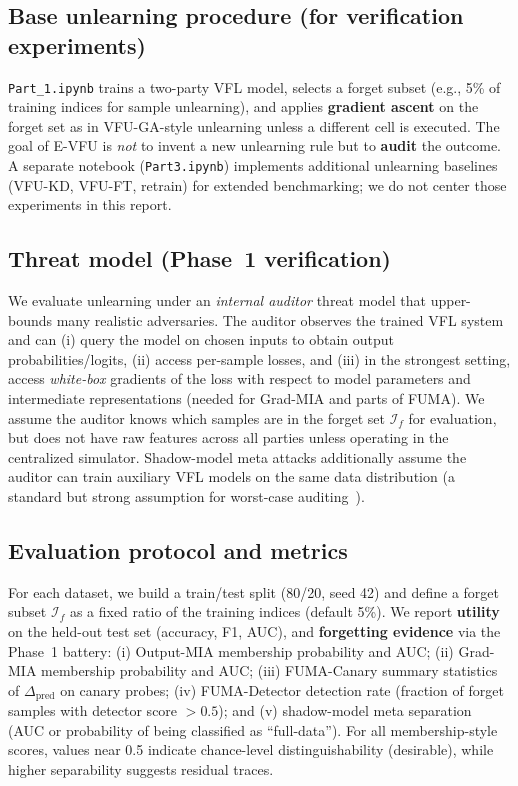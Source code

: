 \documentclass[sigconf,nonacm]{acmart}
\begin{document}
\subsection{Base unlearning procedure (for verification experiments)}
\texttt{Part\_1.ipynb} trains a two-party VFL model, selects a forget subset (e.g., 5\% of training indices for sample unlearning), and applies \textbf{gradient ascent} on the forget set as in VFU-GA-style unlearning unless a different cell is executed. The goal of E-VFU is \emph{not} to invent a new unlearning rule but to \textbf{audit} the outcome. A separate notebook (\texttt{Part3.ipynb}) implements additional unlearning baselines (VFU-KD, VFU-FT, retrain) for extended benchmarking; we do not center those experiments in this report.

\subsection{Threat model (Phase~1 verification)}
We evaluate unlearning under an \emph{internal auditor} threat model that upper-bounds many realistic adversaries. The auditor observes the trained VFL system and can (i) query the model on chosen inputs to obtain output probabilities/logits, (ii) access per-sample losses, and (iii) in the strongest setting, access \emph{white-box} gradients of the loss with respect to model parameters and intermediate representations (needed for Grad-MIA and parts of FUMA). We assume the auditor knows which samples are in the forget set $\mathcal{I}_f$ for evaluation, but does not have raw features across all parties unless operating in the centralized simulator. Shadow-model meta attacks additionally assume the auditor can train auxiliary VFL models on the same data distribution (a standard but strong assumption for worst-case auditing~\cite{shokri2017mia}).

\subsection{Evaluation protocol and metrics}
For each dataset, we build a train/test split (80/20, seed 42) and define a forget subset $\mathcal{I}_f$ as a fixed ratio of the training indices (default 5\%). We report \textbf{utility} on the held-out test set (accuracy, F1, AUC), and \textbf{forgetting evidence} via the Phase~1 battery:
(i) Output-MIA membership probability and AUC; (ii) Grad-MIA membership probability and AUC; (iii) FUMA-Canary summary statistics of $\Delta_{\mathrm{pred}}$ on canary probes; (iv) FUMA-Detector detection rate (fraction of forget samples with detector score $>0.5$); and (v) shadow-model meta separation (AUC or probability of being classified as ``full-data''). For all membership-style scores, values near 0.5 indicate chance-level distinguishability (desirable), while higher separability suggests residual traces.
\end{document}
